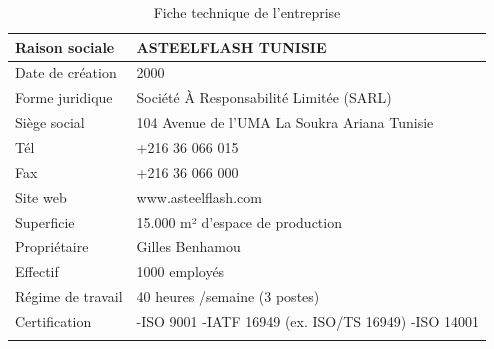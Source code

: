 \newpage

\begin{longtable}{|m{4cm}|m{8cm}|}
                
                \hline 
                    \textbf{Raison sociale} & \textbf{ASTEELFLASH TUNISIE}\\
                \hline
                
                    Date de création
                    & 2000 \\
            
            
                \hline
                    Forme juridique
                    & Société À Responsabilité Limitée (SARL) \\
                    
                    
                \hline
                    Siège social
                    & 104 Avenue de l’UMA La Soukra Ariana Tunisie \\
                               
                \hline
                    Tél
                    & +216 36 066 015 \\
                               
                \hline
                    Fax
                    & +216 36 066 000 \\

                \hline
                    Site web
                    & www.asteelflash.com \\

                \hline
                    Superficie
                    & 15.000 m² d'espace de production \\

                \hline
                    Propriétaire
                    & Gilles Benhamou \\

                \hline
                    Effectif
                    & 1000 employés \\

                \hline
                    Régime de travail
                    & 40 heures /semaine (3 postes) \\

                \hline
                    Certification
                    & -ISO 9001 \newline
                      -IATF 16949 (ex. ISO/TS 16949) \newline
                      -ISO 14001\\
                               

                \hline

              \captionsetup{justification=centering,margin=2cm}
              \caption{Fiche technique de l'entreprise}

            \end{longtable}
